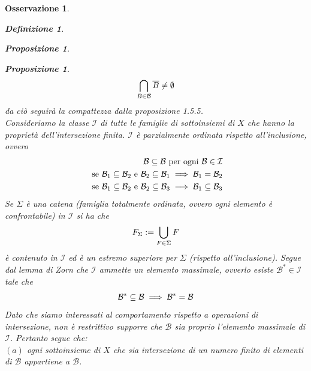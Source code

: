 \documentclass[oneside, 11pt]{amsbook}
\makeatletter
\newcommand{\0}{{(0)}}
\newcommand{\3}{{(3)}}
\theoremstyle{colonplain}
\newtheorem{prop}[thm]{Proposizione}
\theoremstyle{colondefinition}
\newtheorem{defn}[thm]{Definizione}
\theoremstyle{colonremark}
\newtheorem{rmk}[thm]{Osservazione}
\numberwithin{equation}{chapter}
\renewcommand{\proofname}{Dimostrazione}
\renewenvironment{proof}[1][\proofname]{\par
  \pushQED{\end{proof}}%
  \normalfont \topsep6\p@\@plus6\p@\relax
  \trivlist
  \item[\hskip\labelsep\bfseries #1:]\ignorespaces
}{%
  \popQED\endtrivlist\@endpefalse
}
\makeatother
\begin{document}
\begin{rmk}
\begin{defn}
\begin{prop}
\begin{prop}
\begin{proof}
\begin{align}
    \bigcap_{B \in \mathcal{B}} \overline{B} \neq \emptyset \notag
\end{align}
da ciò seguirà la compattezza dalla \textit{proposizione 1.5.5}. \\
Consideriamo la classe $\mathcal{I}$ di tutte le famiglie di sottoinsiemi di $X$ che hanno la proprietà dell'intersezione finita. $\mathcal{I}$ è \textit{parzialmente ordinata} rispetto all'inclusione, ovvero
\begin{align}
    \mathcal{B} \subseteq \mathcal{B} \text{ per ogni } \mathcal{B} \in \mathcal{I} \notag \\
    \text{ se } \mathcal{B}_1 \subseteq \mathcal{B}_2 \text{ e } \mathcal{B}_2 \subseteq \mathcal{B}_1 \implies \mathcal{B}_1 = \mathcal{B}_2 \notag \\
    \text{ se } \mathcal{B}_1 \subseteq \mathcal{B}_2 \text{ e } \mathcal{B}_2 \subseteq \mathcal{B}_3 \implies \mathcal{B}_1 \subseteq \mathcal{B}_3 \notag
\end{align}
Se $\Sigma$ è una \textit{catena} (famiglia \textit{totalmente ordinata}, ovvero ogni elemento è \textit{confrontabile}) in $\mathcal{I}$ si ha che
\begin{align}
    F_\Sigma := \bigcup_{F \in \Sigma} F \notag
\end{align}
è contenuto in $\mathcal{I}$ ed è un estremo superiore per $\Sigma$ (rispetto all'inclusione). Segue dal \textit{lemma di Zorn} che $\mathcal{I}$ ammette un \textit{elemento massimale}, ovverlo esiste $\mathcal{B}^* \in \mathcal{I}$ tale che
\begin{align}
    \mathcal{B}^* \subseteq \mathcal{B} \implies \mathcal{B}^* = \mathcal{B} \notag
\end{align}
Dato che siamo interessati al comportamento rispetto a operazioni di intersezione, non è restrittivo supporre che $\mathcal{B}$ sia proprio l'elemento massimale di $\mathcal{I}$. Pertanto segue che: \\

$(a)$ ogni sottoinsieme di $X$ che sia intersezione di un numero finito di elementi di $\mathcal{B}$ appartiene a $\mathcal{B}$.


\end{proof}
\end{prop}
\end{prop}
\end{defn}
\end{rmk}
\end{document}
